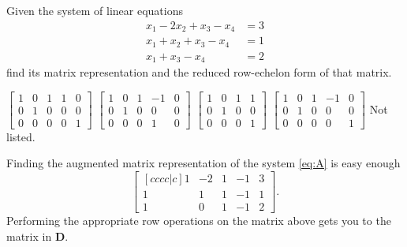\begin{questions}
  \question[10] Given the system of linear equations
  \[
    \label{eq:A}
    \tag{$\bigstar$}
    \begin{aligned}
      x_1-2x_2+x_3-x_4&=3\\
      x_1+x_2+x_3-x_4&=1\\
      x_1+x_3-x_4&=2
    \end{aligned}
  \]
    find its matrix representation and the reduced row-echelon form of that
    matrix.
  \begin{choices}
    \choice $\left[
      \begin{smallmatrix}
        1&0&1&1&0\\0&1&0&0&0\\0&0&0&0&1
      \end{smallmatrix}
    \right]$%
    \choice $\left[
      \begin{smallmatrix}
        1&0&1&-1&0\\0&1&0&0&0\\0&0&0&1&0
      \end{smallmatrix}
    \right]$%
    \choice $\left[
      \begin{smallmatrix}
        1&0&1&1\\0&1&0&0\\0&0&0&1
      \end{smallmatrix}
    \right]$%
    \CorrectChoice $\left[
      \begin{smallmatrix}
        1&0&1&-1&0\\0&1&0&0&0\\0&0&0&0&1
      \end{smallmatrix}
    \right]$%
    \choice Not listed.
  \end{choices}
  \begin{solution}
    Finding the augmented matrix representation of the system \eqref{eq:A}
    is easy enough
    \[
      \begin{bmatrix}[cccc|c]
        1&-2&1&-1&3\\
        1&1&1&-1&1\\
        1&0&1&-1&2
      \end{bmatrix}.
    \]
    Performing the appropriate row operations on the matrix above gets you
    to the matrix in {\color{Red!85!black}\textbf{D}}.
  \end{solution}


\end{questions}
